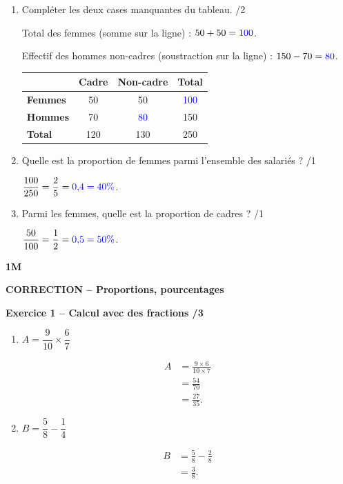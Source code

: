 \documentclass[10pt,a4paper]{article}
\renewcommand{\niveau}{1M}
\renewcommand{\chapitre}{Proportions, pourcentages}
\renewcommand{\interroversion}[1]{
    \noindent\textbf{\niveau}

    \vspace{-0.5cm}
    \begin{center}
        \textbf{\large CORRECTION -- \chapitre}
    \end{center}

    \vspace{0.1cm}
}
\begin{document}
\begin{enumerate}
\item Compléter les deux cases manquantes du tableau. \hfill /2

Total des femmes (somme sur la ligne) : \(50+50=\textcolor{blue}{100}\).

Effectif des hommes non-cadres (soustraction sur la ligne) : \(150-70=\textcolor{blue}{80}\).

\begin{center}
\renewcommand{\arraystretch}{1.5}
\begin{tabular}{|l|c|c|c|}
\hline
 & \textbf{Cadre} & \textbf{Non-cadre} & \textbf{Total} \\
\hline
\textbf{Femmes} & 50 & 50 & \textcolor{blue}{100} \\
\hline
\textbf{Hommes} & 70 & \textcolor{blue}{80} & 150 \\
\hline
\textbf{Total} & 120 & 130 & 250 \\
\hline
\end{tabular}
\end{center}

\item Quelle est la proportion de femmes parmi l'ensemble des salariés ? \hfill /1

\(\dfrac{100}{250}=\dfrac{2}{5}=\textcolor{blue}{0{,}4=40\%}\).

\item Parmi les femmes, quelle est la proportion de cadres ? \hfill /1

\(\dfrac{50}{100}=\dfrac{1}{2}=\textcolor{blue}{0{,}5=50\%}\).
\end{enumerate}

\newpage


\interroversion{D}

\textbf{Exercice 1 -- Calcul avec des fractions \hfill /3}

\begin{enumerate}
\item \(A = \dfrac{9}{10}\times\dfrac{6}{7}\)

\[
\begin{aligned}
A &= \frac{9\times6}{10\times7}\\
  &= \frac{54}{70}\\
  &= \frac{27}{35}.
\end{aligned}
\]

\item \(B = \dfrac{5}{8}-\dfrac{1}{4}\)

\[
\begin{aligned}
B &= \frac{5}{8}-\frac{2}{8}\\
  &= \frac{3}{8}.
\end{aligned}
\]
\end{enumerate}
\end{document}
